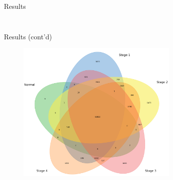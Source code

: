 \documentclass{beamer}
\begin{document}
\begin{frame}{Results}
\begin{columns}
\begin{column}{.48\textwidth}
\begin{figure}[ht]
				\caption*{\label{fig:data-aug}}
			\end{figure}
		\end{column}
	\end{columns}
\end{frame}
\begin{frame}{Results (cont'd)}
	\begin{figure}[ht]
		\centering
		\includegraphics[width=0.7\textwidth,keepaspectratio]{img/network-venn.png}
		\caption*{\label{fig:network-venn}}
	\end{figure}
\end{frame}
\end{document}
